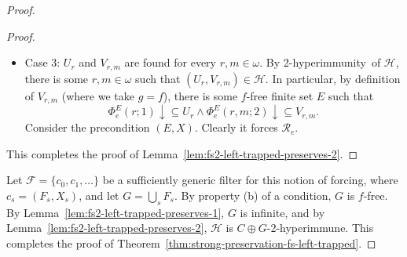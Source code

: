 \documentclass{amsart}
\theoremstyle{definition}
\theoremstyle{remark}
\numberwithin{equation}{section}
\theoremstyle{noparens}
\def\propertyL{2-hyperimmunity}
\def\hyper{2-hyperimmune}
\def\mcal{\mathcal}
\newcommand{\Fcal}{\mathcal{F}}
\newcommand{\Hcal}{\mathcal{H}}
\newcommand{\Rcal}{\mathcal{R}}
\begin{document}
\begin{proof}
\begin{proof}
\begin{itemize}
	By Lemma~\ref{lem:fs-with-enough-sets-free}, there is an  infinite set $Y$
	and some $E\in\mcal{E}$ such that $\Hcal$ is $Y $-\hyper\ and $E \cup Y$
	is $g$-free. Consider the precondition $d=(E, Y)$.
It remains to prove that  $d$ forces $\Phi_e^{ G}(r, m;2) \uparrow$.
	Since $E \cup Y$ is $g$-free, so every $G$ satisfying $(E,Y)$ is $g$-free.
By definition of $g$ (namely (\ref{fsts-fsnstongpreserve-defofg})) and $\Phi_e^{E}(r;1)\downarrow\subseteq U_r $,
for every $G$ satisfying $(E,Y)$,
$\Phi_e^{ G}(r, m;2) \uparrow$.

	\bigskip

	\item Case 3: $U_r$ and $V_{r,m}$ are found for every $r,m \in \omega$.
	By  \propertyL\ of $\Hcal$, there is some $r, m \in \omega$
	such that $(U_r, V_{r,m}) \in \Hcal$.
	In particular, by definition of $V_{r,m}$ (where we take   $g = f$),
	there is some $f$-free finite set $E$ such that
	$$
	\Phi_e^{E}(r;1) \downarrow \subseteq U_r
		\wedge \Phi_e^{E}(r, m;2) \downarrow \subseteq V_{r,m}.
	$$
Consider the precondition $(E, X)$.
Clearly it forces $\Rcal_e$.
\end{itemize}
This completes the proof of Lemma~\ref{lem:fs2-left-trapped-preserves-2}.
\end{proof}



Let $\Fcal = \{c_0, c_1, \dots \}$ be a sufficiently generic filter for this notion of forcing,
where $c_s = (F_s, X_s)$, and let $G = \bigcup_s F_s$.
By property (b) of a condition, $G$ is $f$-free.
By Lemma~\ref{lem:fs2-left-trapped-preserves-1}, $G$ is infinite,
and by Lemma~\ref{lem:fs2-left-trapped-preserves-2},
$\Hcal$ is $C \oplus G$-\hyper.
This completes the proof of Theorem~\ref{thm:strong-preservation-fs-left-trapped}.
\end{proof}




%

%
\end{document}
